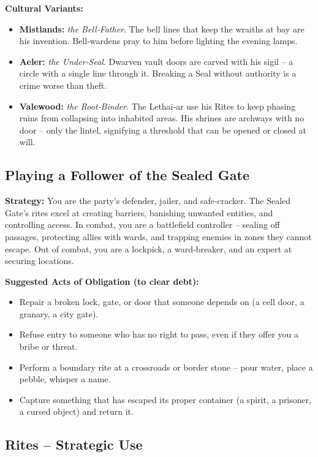 \documentclass[10pt,a5paper]{book}
\begin{document}
\textbf{Cultural Variants:}
\begin{itemize}
    \item \textbf{Mistlands:} \textit{the Bell‑Father}. The bell lines that keep the wraiths at bay are his invention. Bell‑wardens pray to him before lighting the evening lamps.
    \item \textbf{Aeler:} \textit{the Under‑Seal}. Dwarven vault doors are carved with his sigil – a circle with a single line through it. Breaking a Seal without authority is a crime worse than theft.
    \item \textbf{Valewood:} \textit{the Root‑Binder}. The Lethai‑ar use his Rites to keep phasing ruins from collapsing into inhabited areas. His shrines are archways with no door – only the lintel, signifying a threshold that can be opened or closed at will.
\end{itemize}

\subsection*{Playing a Follower of the Sealed Gate}

\textbf{Strategy:} You are the party’s defender, jailer, and safe‑cracker. The Sealed Gate’s rites excel at creating barriers, banishing unwanted entities, and controlling access. In combat, you are a battlefield controller – sealing off passages, protecting allies with wards, and trapping enemies in zones they cannot escape. Out of combat, you are a lockpick, a ward‑breaker, and an expert at securing locations.

\textbf{Suggested Acts of Obligation (to clear debt):}
\begin{itemize}
    \item Repair a broken lock, gate, or door that someone depends on (a cell door, a granary, a city gate).
    \item Refuse entry to someone who has no right to pass, even if they offer you a bribe or threat.
    \item Perform a boundary rite at a crossroads or border stone – pour water, place a pebble, whisper a name.
    \item Capture something that has escaped its proper container (a spirit, a prisoner, a cursed object) and return it.
\end{itemize}

\subsection*{Rites – Strategic Use}
\end{document}
